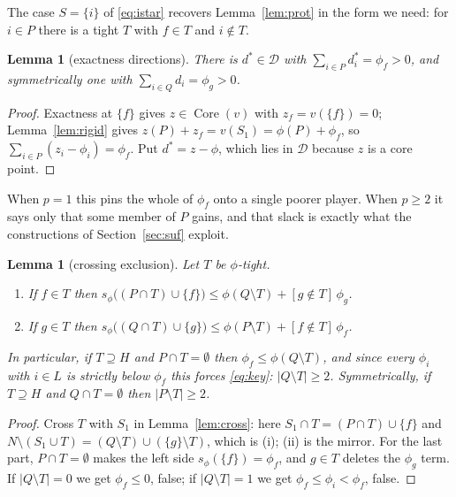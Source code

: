 \documentclass[11pt]{article}
\newtheorem{lemma}[theorem]{Lemma}
\newcommand{\core}{\operatorname{Core}}
\begin{document}
The case $S=\{i\}$ of \eqref{eq:istar} recovers Lemma~\ref{lem:prot} in the
form we need: for $i\in P$ there is a tight $T$ with $f\in T$ and $i\notin T$.

\begin{lemma}[exactness directions]\label{lem:edir}
There is $d^\ast\in\mathcal D$ with $\sum_{i\in P}d^\ast_i=\phi_f>0$, and
symmetrically one with $\sum_{i\in Q}d_i=\phi_g>0$.
\end{lemma}

\begin{proof}
Exactness at $\{f\}$ gives $z\in\core(v)$ with $z_f=v(\{f\})=0$;
Lemma~\ref{lem:rigid} gives $z(P)+z_f=v(S_1)=\phi(P)+\phi_f$, so
$\sum_{i\in P}(z_i-\phi_i)=\phi_f$.  Put $d^\ast=z-\phi$, which lies in
$\mathcal D$ because $z$ is a core point.
\end{proof}

When $p=1$ this pins the whole of $\phi_f$ onto a single poorer player.  When
$p\ge2$ it says only that some member of $P$ gains, and that slack is exactly
what the constructions of Section~\ref{sec:suf} exploit.

\begin{lemma}[crossing exclusion]\label{lem:xstar}
Let $T$ be $\phi$-tight.
\begin{enumerate}[nosep,label=(\roman*)]
\item If $f\in T$ then
 $s_\phi\bigl((P\cap T)\cup\{f\}\bigr)\le\phi(Q\setminus T)+[g\notin T]\,\phi_g$.
\item If $g\in T$ then
 $s_\phi\bigl((Q\cap T)\cup\{g\}\bigr)\le\phi(P\setminus T)+[f\notin T]\,\phi_f$.
\end{enumerate}
In particular, if $T\supseteq H$ and $P\cap T=\emptyset$ then
$\phi_f\le\phi(Q\setminus T)$, and since every $\phi_i$ with $i\in L$ is
strictly below $\phi_f$ this forces \eqref{eq:key}: $|Q\setminus T|\ge2$.
Symmetrically, if $T\supseteq H$ and $Q\cap T=\emptyset$ then
$|P\setminus T|\ge2$.
\end{lemma}

\begin{proof}
Cross $T$ with $S_1$ in Lemma~\ref{lem:cross}: here
$S_1\cap T=(P\cap T)\cup\{f\}$ and
$N\setminus(S_1\cup T)=(Q\setminus T)\cup(\{g\}\setminus T)$, which is (i);
(ii) is the mirror.  For the last part, $P\cap T=\emptyset$ makes the left side
$s_\phi(\{f\})=\phi_f$, and $g\in T$ deletes the $\phi_g$ term.  If
$|Q\setminus T|=0$ we get $\phi_f\le0$, false; if $|Q\setminus T|=1$ we get
$\phi_f\le\phi_i<\phi_f$, false.
\end{proof}
\end{document}
